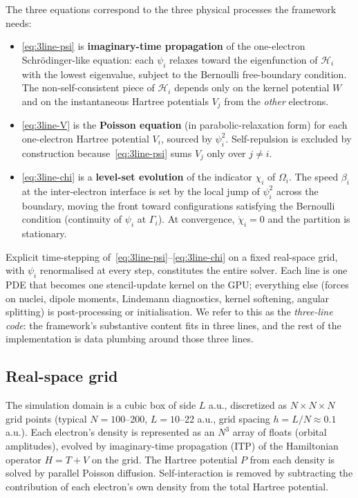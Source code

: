 \documentclass[11pt]{article}
\begin{document}
The three equations correspond to the three physical processes the framework needs:
\begin{itemize}\setlength{\itemsep}{2pt}
\item \eqref{eq:3line-psi} is \textbf{imaginary-time propagation} of the one-electron Schr\"odinger-like equation: each $\psi_i$ relaxes toward the eigenfunction of $\mathcal{H}_i$ with the lowest eigenvalue, subject to the Bernoulli free-boundary condition. The non-self-consistent piece of $\mathcal{H}_i$ depends only on the kernel potential $W$ and on the instantaneous Hartree potentials $V_j$ from the \emph{other} electrons.
\item \eqref{eq:3line-V} is the \textbf{Poisson equation} (in parabolic-relaxation form) for each one-electron Hartree potential $V_i$, sourced by $\psi_i^2$. Self-repulsion is excluded by construction because~\eqref{eq:3line-psi} sums $V_j$ only over $j \ne i$.
\item \eqref{eq:3line-chi} is a \textbf{level-set evolution} of the indicator $\chi_i$ of $\Omega_i$. The speed $\beta_i$ at the inter-electron interface is set by the local jump of $\psi_i^2$ across the boundary, moving the front toward configurations satisfying the Bernoulli condition (continuity of $\psi_i$ at $\Gamma_i$). At convergence, $\dot{\chi}_i = 0$ and the partition is stationary.
\end{itemize}

Explicit time-stepping of~\eqref{eq:3line-psi}--\eqref{eq:3line-chi} on a fixed real-space grid, with $\psi_i$ renormalised at every step, constitutes the entire solver. Each line is one PDE that becomes one stencil-update kernel on the GPU; everything else (forces on nuclei, dipole moments, Lindemann diagnostics, kernel softening, angular splitting) is post-processing or initialisation. We refer to this as the \emph{three-line code}: the framework's substantive content fits in three lines, and the rest of the implementation is data plumbing around those three lines.

\subsection{Real-space grid}

The simulation domain is a cubic box of side $L$ a.u., discretized as $N \times N \times N$ grid points (typical $N = 100$--200, $L = 10$--22 a.u., grid spacing $h = L/N \approx 0.1$ a.u.). Each electron's density is represented as an $N^3$ array of floats (orbital amplitudes), evolved by imaginary-time propagation (ITP) of the Hamiltonian operator $H = T + V$ on the grid. The Hartree potential $P$ from each density is solved by parallel Poisson diffusion. Self-interaction is removed by subtracting the contribution of each electron's own density from the total Hartree potential.
\end{document}
